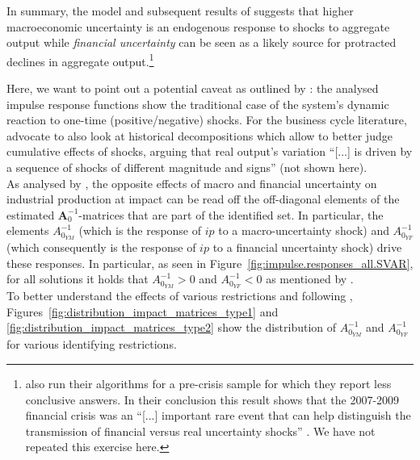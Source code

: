 \documentclass[a4paper,11pt,listof=nochaptergap,oneside,pointednumbers,bibtotoc,bigheadings,liststotoc,hidelinks]{scrbook}
\theoremstyle{mysatz}
\theoremstyle{mydefinition}
\theoremstyle{mytheorem}
\theoremstyle{mybemerkung}
\newcommand{\vect}[1]{\boldsymbol{\mathbf{#1}}}
\begin{document}
In summary, the model and subsequent results of \citet{ludvigsonetal:19} suggests that higher macroeconomic uncertainty is an endogenous response to shocks to aggregate output while \textit{financial uncertainty} can be seen as a likely source for protracted declines in aggregate output.\footnote{\citet{ludvigsonetal:18} also run their algorithms for a pre-crisis sample for which they report less conclusive answers. In their conclusion this result shows that the 2007-2009 financial crisis was an ``[...] important rare event that can help distinguish the transmission of financial versus real uncertainty shocks'' \citet[p. 25]{ludvigsonetal:18}. We have not repeated this exercise here.}

Here, we want to point out a potential caveat as outlined by \citet{lutkepohlkilian:17}: the analysed impulse response functions show the traditional case of the system's dynamic reaction to one-time (positive/negative) shocks. For the business cycle literature, \citet[p. 120]{lutkepohlkilian:17} advocate to also look at historical decompositions which allow to better judge cumulative effects of shocks, arguing that real output's variation ``[...] is driven by a sequence of shocks of different magnitude and signs'' (not shown here).\\

As analysed by \citet{ludvigsonetal:19}, the opposite effects of macro and financial uncertainty on industrial production at impact can be read off the off-diagonal elements of the estimated $\vect{A}_0^{-1}$-matrices that are part of the identified set. In particular, the elements $A_{0_{YM}}^{-1}$ (which is the response of $ip$ to a macro-uncertainty shock) and $A_{0_{YF}}^{-1}$ (which consequently is the response of $ip$ to a financial uncertainty shock) drive these responses. In particular, as seen in Figure~\ref{fig:impulse.responses_all.SVAR}, for all solutions it holds that $A_{0_{YM}}^{-1} > 0$ and $A_{0_{YF}}^{-1} < 0$ as mentioned by \citet{ludvigsonetal:19}.\\

To better understand the effects of various restrictions and following \citet{ludvigsonetal:19}, Figures~\ref{fig:distribution_impact_matrices_type1} and \ref{fig:distribution_impact_matrices_type2} show the distribution of $A_{0_{YM}}^{-1}$ and $A_{0_{YF}}^{-1}$ for various identifying restrictions.
\end{document}
